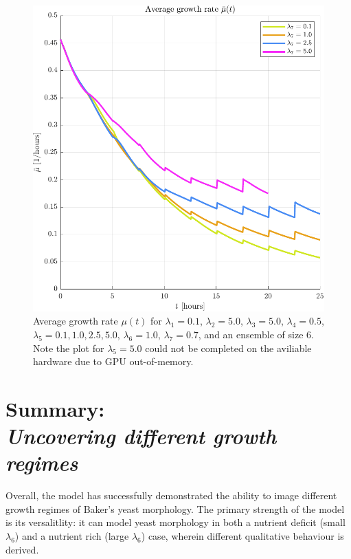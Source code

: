 \begin{figure}[!htb] %
    \centering
    \includegraphics[width= \textwidth]{
        chapter4/figures/Average_mu_EnsembleSize_6o0_L1_0o10_L2_5o00_L3_5o00_L4_0o50_L5_0o10_L6_1o00_L7_0o70.pdf}
    \caption{Average growth rate $\mu(t)$ for 
             $\lambda_1 = 0.1$,  
             $\lambda_2 = 5.0$, 
             $\lambda_3 = 5.0$, 
             $\lambda_4 = 0.5$, 
             $\lambda_5 = 0.1, 1.0, 2.5, 5.0$, 
             $\lambda_6 = 1.0$, 
             $\lambda_7 = 0.7$, and an ensemble of size $6$. Note the plot 
             for $\lambda_5 = 5.0$ could not be completed on the aviliable hardware
             due to GPU out-of-memory.}
    \label{fig:averageMuComparison_varyMobility}
\end{figure}


\section{Summary: \\ \textit{Uncovering different growth regimes}}

Overall, the model has successfully demonstrated the ability 
to image different growth regimes of Baker's yeast morphology.
The primary strength of the model is its versalitlity:
it can model yeast morphology in both a nutrient deficit (small $\lambda_6$)
and a nutrient rich (large $\lambda_6$) case, wherein 
different qualitative behaviour is derived. 
\\

